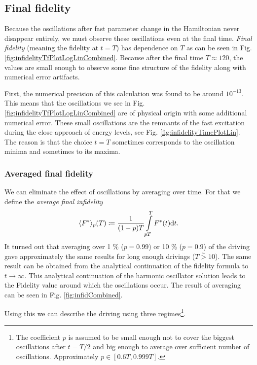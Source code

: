 \subsection{Final fidelity}
Because the oscillations after fast parameter change in the Hamiltonian never disappear entirely, we must observe these oscillations even at the final time. \emph{Final fidelity} (meaning the fidelity at $t=T$) has dependence on $T$ as can be seen in Fig. \ref{fig:infidelityTfPlotLogLinCombined}. Because after the final time $T\approx 120$, the values are small enough to observe some fine structure of the fidelity along with numerical error artifacts.


First, the numerical precision of this calculation was found to be around $10^{-13}$. This means that the oscillations we see in Fig. \ref{fig:infidelityTfPlotLogLinCombined} are of physical origin with some additional numerical error. These small oscillations are the remnants of the fast excitation during the close approach of energy levels, see Fig. \ref{fig:infidelityTimePlotLin}. The reason is that the choice $t=T$ sometimes corresponds to the oscillation minima and sometimes to its maxima.



\subsubsection{Averaged final fidelity}
We can eliminate the effect of oscillations by averaging over time. For that we define the \emph{average final infidelity}
\begin{equation}
    \langle F^*\rangle_p(T) \coloneqq \frac{1}{(1-p) T}\int\limits_{p T}^{T} F^*(t)\mathrm{d} t.
\end{equation}
It turned out that averaging over 1 \% ($p=0.99$) or 10 \% ($p=0.9$) of the driving gave approximately the same results for long enough drivings ($T\overset{\sim}{>} 10$). The same result can be obtained from the analytical continuation of the fidelity formula to $t\rightarrow  \infty$. This analytical continuation of the harmonic oscillator solution leads to the Fidelity value around which the oscillations occur. The result of averaging can be seen in Fig. \ref{fig:infidCombined}.

Using this we can describe the driving using three regimes\footnote{The coefficient $p$ is assumed to be small enough not to cover the biggest oscillations after $t=T/2$ and big enough to average over sufficient number of oscillations. Approximately $p\in[0.6T,0.999T]$.}.

